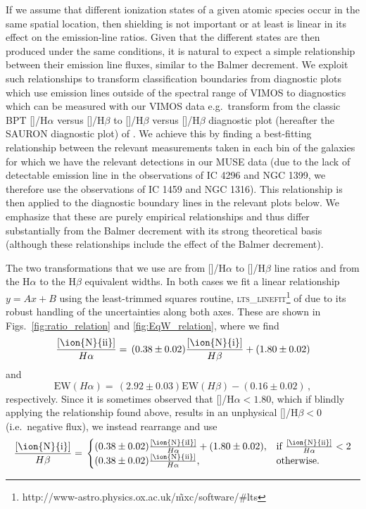 \documentclass[a4paper,fleqn,usenatbib]{mnras}
\begin{document}
	If we assume that different ionization states of a given atomic species occur in the same spatial location, then shielding is not important or at least is linear in its effect on the emission-line ratios. Given that the different states are then produced under the same conditions, it is natural to expect a simple relationship between their emission line fluxes, similar to the Balmer decrement. We exploit such relationships to transform classification boundaries from diagnostic plots which use emission lines outside of the spectral range of VIMOS to diagnostics which can be measured with our VIMOS data e.g.\ transform from the classic BPT []/H$\alpha$ versus []/H$\beta$ to []/H$\beta$ versus []/H$\beta$ diagnostic plot (hereafter the SAURON diagnostic plot) of \citet{Sarzi2010}. We achieve this by finding a best-fitting relationship between the relevant measurements taken in each bin of the galaxies for which we have the relevant detections in our MUSE data (due to the lack of detectable emission line in the observations of IC 4296 and NGC 1399, we therefore use the observations of IC 1459 and NGC 1316). This relationship is then applied to the diagnostic boundary lines in the relevant plots below. We emphasize that these are purely empirical relationships and thus differ substantially from the Balmer decrement with its strong theoretical basis (although these relationships include the effect of the Balmer decrement). 

	The two transformations that we use are from []/H$\alpha$ to []/H$\beta$ line ratios and from the H$\alpha$ to the H$\beta$ equivalent widths. In both cases we fit a linear relationship $y = Ax + B$ using the least-trimmed squares routine, \textsc{lts\_linefit}\footnote{http://www-astro.physics.ox.ac.uk/\~mxc/software/\#lts}%
	 of \citet{Cappellari2013} due to its robust handling of the uncertainties along both axes. These are shown in Figs.\ \ref{fig:ratio_relation} and \ref{fig:EqW_relation}, where we find
	\begin{equation}
		\frac{[\text{\ion{N}{ii}}]}{H\alpha} = \, (0.38 \pm 0.02) \frac{[\text{\ion{N}{i}}]}{H\beta} + (1.80 \pm 0.02)
	\end{equation}
	and	
	\begin{equation}
		\mathrm{EW}(H\alpha) = \, (2.92 \pm 0.03) \mathrm{EW}(H\beta) - (0.16 \pm 0.02) \, ,
			\label{eq:EqW_dec}
	\end{equation}
	respectively. Since it is sometimes observed that []/H$\alpha < 1.80$, which if blindly applying the relationship found above, results in an unphysical []/H$\beta < 0$ (i.e.\ negative flux), we instead rearrange and use
	\begin{equation}
		\frac{[\text{\ion{N}{i}}]}{H\beta} = \, 
		\begin{cases}
			(0.38 \pm 0.02) \frac{[\text{\ion{N}{iI}}]}{H\alpha} + (1.80 \pm 0.02), & \text{if}\ \frac{[\text{\ion{N}{ii}}]}{H\alpha} < 2 \\
			(0.38 \pm 0.02) \frac{[\text{\ion{N}{ii}}]}{H\alpha}, & \text{otherwise.}
		\end{cases}
		\label{eq:N_dec}
	\end{equation}
\end{document}
